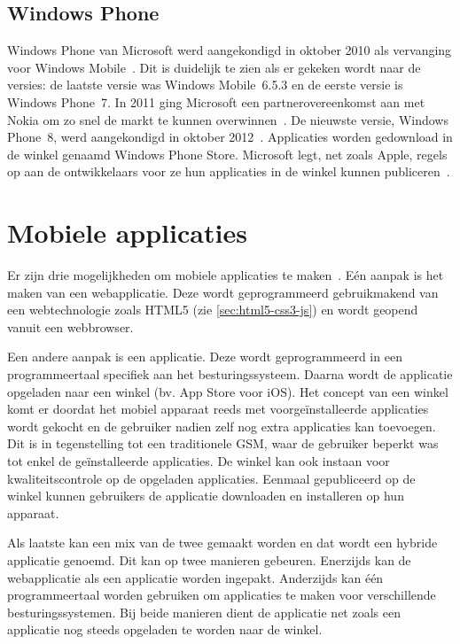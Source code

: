 \subsection{Windows Phone}
Windows Phone van Microsoft werd aangekondigd in oktober 2010 als vervanging voor Windows Mobile~\cite{Seitz2010,Lieberman2010}. 
Dit is duidelijk te zien als er gekeken wordt naar de versies: de laatste versie was Windows Mobile~6.5.3 en de eerste versie is Windows Phone~7. 
In 2011 ging Microsoft een partnerovereenkomst aan met Nokia om zo snel de markt te kunnen overwinnen~\cite{Microsoft2011}. 
De nieuwste versie, Windows Phone~8, werd aangekondigd in oktober 2012~\cite{Reed2012}. 
Applicaties worden gedownload in de winkel genaamd Windows Phone Store.
Microsoft legt, net zoals Apple, regels op aan de ontwikkelaars voor ze hun applicaties in de winkel kunnen publiceren~\cite{Microsoft2013a}.


\section{Mobiele applicaties}
\label{sec:mobiele-applicaties}
Er zijn drie mogelijkheden om mobiele applicaties te maken~\cite{Accenture2012,Hales2012}. Eén aanpak is het maken van een webapplicatie.
Deze wordt geprogrammeerd gebruikmakend van een webtechnologie zoals HTML5 (zie \ref{sec:html5-css3-js}) en wordt geopend vanuit een webbrowser. 

Een andere aanpak is een  applicatie. 
Deze wordt geprogrammeerd in een programmeertaal specifiek aan het besturingssysteem.
Daarna wordt de applicatie opgeladen naar een winkel (bv. App Store voor iOS).
Het concept van een winkel komt er doordat het mobiel apparaat reeds met voorgeïnstalleerde applicaties wordt gekocht en de gebruiker nadien zelf nog extra applicaties kan toevoegen.
Dit is in tegenstelling tot een traditionele GSM, waar de gebruiker beperkt was tot enkel de geïnstalleerde applicaties. 
De winkel kan ook instaan voor kwaliteitscontrole op de opgeladen applicaties.
Eenmaal gepubliceerd op de winkel kunnen gebruikers de applicatie downloaden en installeren op hun apparaat.

Als laatste kan een mix van de twee gemaakt worden en dat wordt een hybride applicatie genoemd.
Dit kan op twee manieren gebeuren.
Enerzijds kan de webapplicatie als een  applicatie worden ingepakt.
Anderzijds kan één programmeertaal worden gebruiken om  applicaties te maken voor verschillende besturingssystemen.
Bij beide manieren dient de applicatie net zoals een  applicatie nog steeds opgeladen te worden naar de winkel.

